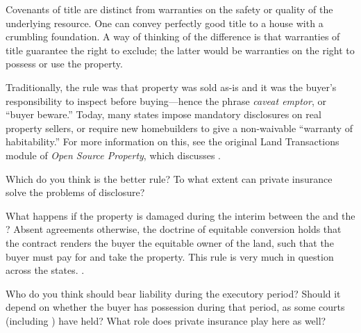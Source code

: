 \item {}Covenants of title are distinct from
warranties on the safety or
quality of the underlying resource. One can convey perfectly good title to a
house with a crumbling foundation. A way of thinking of the difference is that
warranties of title guarantee the right to exclude; the latter would be
warranties on the right to possess or use the property.



Traditionally, the rule was that property was sold as-is and it was the buyer's
responsibility to inspect before buying---hence the phrase \emph{caveat emptor},
or ``buyer beware.'' Today, many states impose mandatory disclosures on real
property sellers, or require new homebuilders to give a non-waivable ``warranty
of habitability.'' For more information on this, see the original Land
Transactions module of \emph{Open Source Property}, which discusses
.

Which do you think is the better rule? To what extent can private insurance
solve the problems of disclosure?


\item What happens if the property is damaged during the interim
 between the  and the
?
Absent agreements otherwise, the doctrine of equitable conversion holds that the
contract renders the buyer the equitable owner of the land, such that the buyer
must pay for and take the property. This rule is very much in question across
the states. .

Who do you think should bear liability during the executory period? Should it
depend on whether the buyer has possession during that period, as some courts
(including ) have held? What role does private
insurance play here as well?

